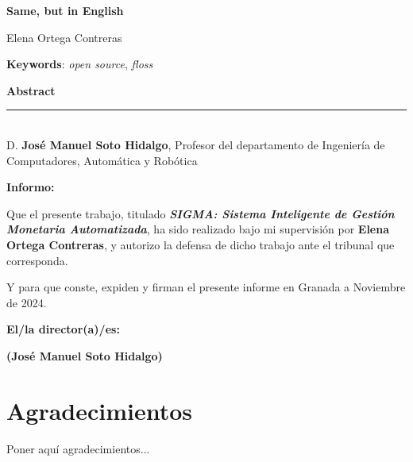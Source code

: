 \cleardoublepage

\begin{center}
	{\large\bfseries Same, but in English}\\
\end{center}
\begin{center}
	Elena Ortega Contreras\\
\end{center}
\vspace{0.5cm}
\noindent\textbf{Keywords}: \textit{open source}, \textit{floss}
\vspace{0.7cm}

\noindent\textbf{Abstract}\\


\cleardoublepage

\thispagestyle{empty}

\noindent\rule[-1ex]{\textwidth}{2pt}\\[4.5ex]

D. \textbf{José Manuel Soto Hidalgo}, Profesor del departamento de Ingeniería de Computadores, Automática y Robótica

\vspace{0.5cm}

\textbf{Informo:}

\vspace{0.5cm}

Que el presente trabajo, titulado \textit{\textbf{SIGMA: Sistema Inteligente de Gestión Monetaria Automatizada}},
ha sido realizado bajo mi supervisión por \textbf{Elena Ortega Contreras}, y autorizo la defensa de dicho trabajo ante el tribunal
que corresponda.

\vspace{0.5cm}

Y para que conste, expiden y firman el presente informe en Granada a Noviembre de 2024.

\vspace{1cm}

\textbf{El/la director(a)/es: }

\vspace{5cm}

\noindent \textbf{(José Manuel Soto Hidalgo)}

\chapter*{Agradecimientos}

Poner aquí agradecimientos...

